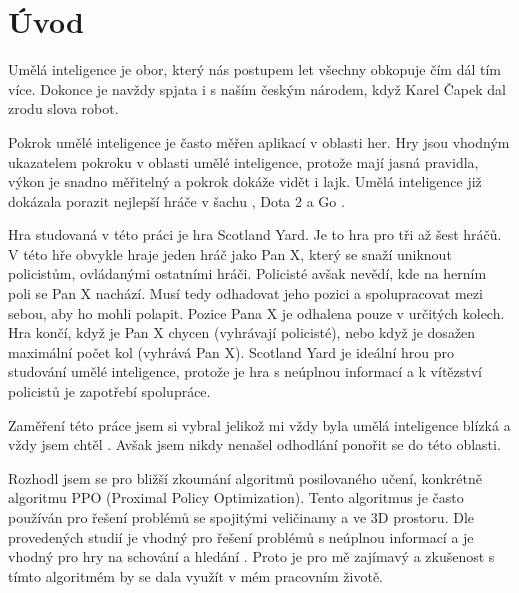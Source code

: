 
%

\chapter{Úvod}
\label{uvod}

Umělá inteligence je obor, který nás postupem let všechny obkopuje čím dál tím více.
Dokonce je navždy spjata i s naším českým národem, když Karel Čapek dal zrodu slova robot.

Pokrok umělé inteligence je často měřen aplikací v oblasti her.
Hry jsou vhodným ukazatelem pokroku v oblasti umělé inteligence, protože mají jasná pravidla, výkon je snadno měřitelný a pokrok dokáže vidět i lajk.
Umělá inteligence již dokázala porazit nejlepší hráče v šachu \cite{DeepBlue}, Dota 2 \cite{Dota2} a Go \cite{AlphaGo}.

Hra studovaná v této práci je hra Scotland Yard.
Je to hra pro tři až šest hráčů.
V této hře obvykle hraje jeden hráč jako Pan X, který se snaží uniknout policistům, ovládanými ostatními hráči.
Policisté avšak nevědí, kde na herním poli se Pan X nachází.
Musí tedy odhadovat jeho pozici a spolupracovat mezi sebou, aby ho mohli polapit.
Pozice Pana X je odhalena pouze v určitých kolech.
Hra končí, když je Pan X chycen (vyhrávají policisté), nebo když je dosažen maximální počet kol (vyhrává Pan X).
Scotland Yard je ideální hrou pro studování umělé inteligence, protože je hra s neúplnou informací a k vítězství policistů je zapotřebí spolupráce.

Zaměření této práce jsem si vybral jelikož mi vždy byla umělá inteligence blízká a vždy jsem chtěl .
Avšak jsem nikdy nenašel odhodlání ponořit se do této oblasti.

Rozhodl jsem se pro bližší zkoumání algoritmů posilovaného učení, konkrétně algoritmu PPO (Proximal Policy Optimization).
Tento algoritmus je často používán pro řešení problémů se spojitými veličinamy a ve 3D prostoru.
Dle provedených studií je vhodný pro řešení problémů s neúplnou informací \cite{Manille} a je vhodný pro hry na schování a hledání \cite{PPO_Hide_Seek}.
Proto je pro mě zajímavý a zkušenost s tímto algoritmém by se dala využít v mém pracovním životě.

